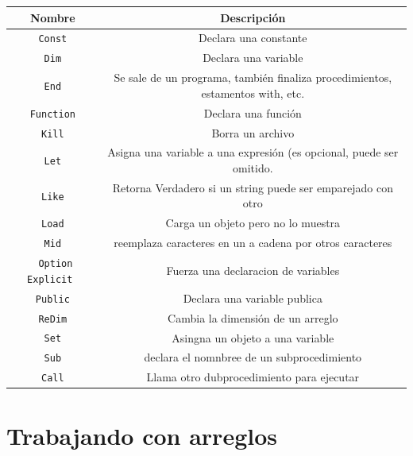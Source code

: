 \begin{table}[H]
    \centering
    \begin{tabular}{c|c}
    Nombre     & Descripción \\ \hline \hline
    \texttt{ Const }             & Declara una constante  \\ \hline
    \texttt{ Dim }               & Declara una variable  \\ \hline
    \texttt{ End }               & Se sale de un programa, también finaliza procedimientos, estamentos with, etc. \\ \hline
    \texttt{ Function }          & Declara una función  \\ \hline
    \texttt{ Kill }              & Borra un archivo  \\ \hline
    \texttt{ Let }               & Asigna una variable a una expresión (es opcional, puede ser omitido.  \\ \hline
    \texttt{ Like }              & Retorna Verdadero si un string puede ser emparejado con otro  \\ \hline
    \texttt{ Load }              & Carga un objeto pero no lo muestra  \\ \hline
    \texttt{ Mid }               & reemplaza caracteres en un a cadena por otros caracteres  \\ \hline
    \texttt{ Option Explicit }   & Fuerza una declaracion de variables  \\ \hline
    \texttt{ Public }            & Declara una variable publica  \\ \hline
    \texttt{ ReDim }             & Cambia la dimensión de un arreglo  \\ \hline
    \texttt{ Set }               & Asingna un objeto a una variable  \\ \hline
    \texttt{ Sub }               & declara el nomnbree de un subprocedimiento  \\ \hline
    \texttt{ Call }              & Llama otro dubprocedimiento para ejecutar  \\ \hline
    \end{tabular}
\end{table}

\section{Trabajando con arreglos}